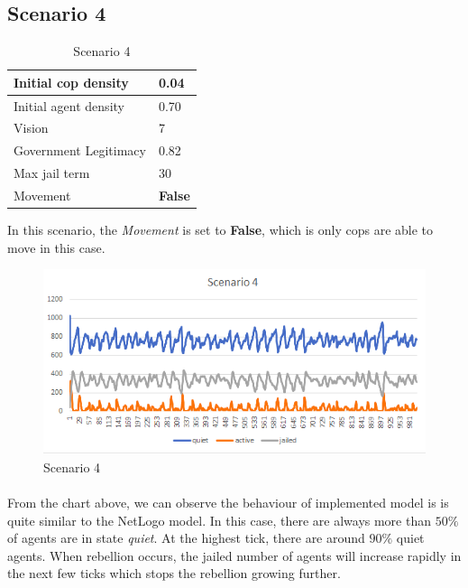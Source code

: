\documentclass[11pt]{article}
\begin{document}
      \subsection{Scenario 4}
      \begin{table}[ht]
        \begin{center}
          \begin{tabular}{|l|l|}
          \hline
            Initial cop density & 0.04 \\
          \hline
            Initial agent density & 0.70 \\
          \hline
            Vision & 7 \\
          \hline
            Government Legitimacy & 0.82 \\
          \hline
            Max jail term & 30 \\
          \hline
            Movement & \textbf{False} \\
          \hline
          \end{tabular}
          \caption{Scenario 4}\label{table4}
        \end{center}
      \end{table}
      In this scenario, the \textit{Movement} is set to \textbf{False}, which is
      only cops are able to move in this case.
      \begin{figure}[h!]
        \includegraphics[width=\linewidth]{Scenario_4.png}
        \caption{Scenario 4}
        \label{fig:scenario}
      \end{figure}

      \paragraph{}
      From the chart above, we can observe the behaviour of implemented model is
      is quite similar to the NetLogo model. In this case, there are always more than 
      $50\%$ of agents are in state \textit{quiet}. At the highest tick, there
      are around $90\%$ quiet agents. When rebellion occurs, the jailed number
      of agents will increase rapidly in the next few ticks which stops the rebellion
      growing further.
\end{document}
